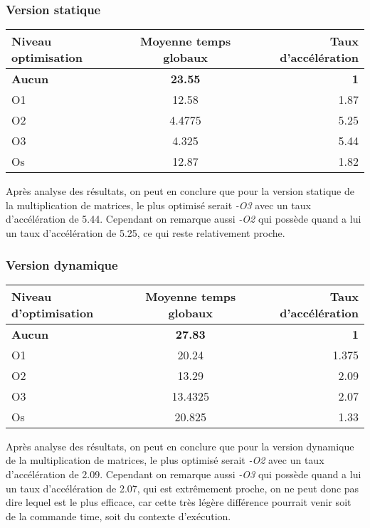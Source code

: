 \documentclass{rapport}
\begin{document}
\subsubsection*{Version statique}
\begin{center}
    \begin{tabular}{ l|c|r }
        Niveau optimisation & Moyenne temps globaux & Taux d'accélération \\
        \hline
        \textbf{Aucun} & \textbf{23.55} & \textbf{1} \\ 
        O1 & 12.58 & 1.87 \\  
        O2 & 4.4775 & 5.25 \\  
        O3 & 4.325 & 5.44 \\  
        Os & 12.87 & 1.82
    \end{tabular}
\end{center}
Après analyse des résultats, on peut en conclure que pour la version statique de la multiplication de matrices, le plus optimisé serait \textit{-O3} avec un taux d'accélération de 5.44.
\newline Cependant on remarque aussi \textit{-O2} qui possède quand a lui un taux d'accélération de 5.25, ce qui reste relativement proche.

\subsubsection*{Version dynamique}
\begin{center}
    \begin{tabular}{ l|c|r }
        Niveau d'optimisation & Moyenne temps globaux & Taux d'accélération \\
        \hline
        \textbf{Aucun} & \textbf{27.83} & \textbf{1} \\ 
        O1 & 20.24 & 1.375 \\  
        O2 & 13.29 & 2.09 \\  
        O3 & 13.4325 & 2.07 \\  
        Os & 20.825 & 1.33
    \end{tabular}
\end{center}
Après analyse des résultats, on peut en conclure que pour la version dynamique de la multiplication de matrices, le plus optimisé serait \textit{-O2} avec un taux d'accélération de 2.09.
\newline Cependant on remarque aussi \textit{-O3} qui possède quand a lui un taux d'accélération de 2.07, qui est extrêmement proche, on ne peut donc pas dire lequel est le plus efficace, car cette très légère différence pourrait venir soit de la commande time, soit du contexte d'exécution.
\end{document}
